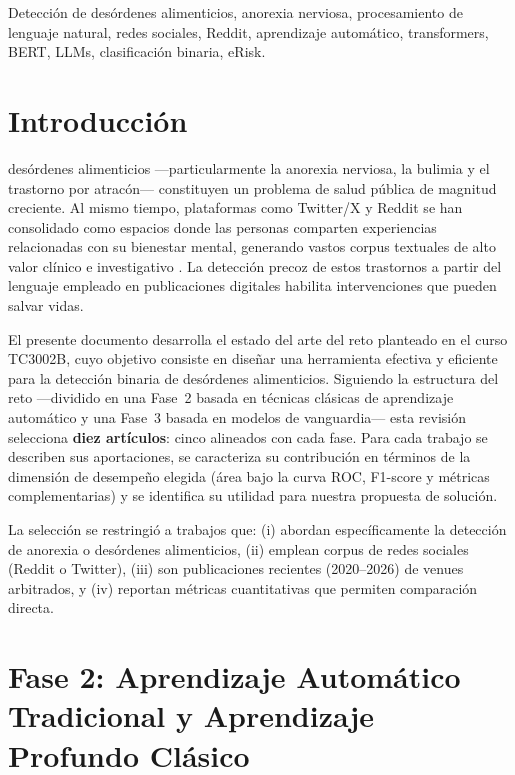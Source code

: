 \documentclass[journal]{IEEEtran}
\begin{document}
\begin{IEEEkeywords}
Detección de desórdenes alimenticios, anorexia nerviosa, procesamiento de lenguaje natural, redes sociales, Reddit, aprendizaje automático, transformers, BERT, LLMs, clasificación binaria, eRisk.
\end{IEEEkeywords}

\section{Introducción}

 desórdenes alimenticios ---particularmente la anorexia nerviosa, la bulimia y el trastorno por atracón--- constituyen un problema de salud pública de magnitud creciente. Al mismo tiempo, plataformas como Twitter/X y Reddit se han consolidado como espacios donde las personas comparten experiencias relacionadas con su bienestar mental, generando vastos corpus textuales de alto valor clínico e investigativo \cite{montejo2024survey}. La detección precoz de estos trastornos a partir del lenguaje empleado en publicaciones digitales habilita intervenciones que pueden salvar vidas.

El presente documento desarrolla el estado del arte del reto planteado en el curso TC3002B, cuyo objetivo consiste en diseñar una herramienta efectiva y eficiente para la detección binaria de desórdenes alimenticios. Siguiendo la estructura del reto ---dividido en una Fase~2 basada en técnicas clásicas de aprendizaje automático y una Fase~3 basada en modelos de vanguardia--- esta revisión selecciona \textbf{diez artículos}: cinco alineados con cada fase. Para cada trabajo se describen sus aportaciones, se caracteriza su contribución en términos de la dimensión de desempeño elegida (área bajo la curva ROC, F1-score y métricas complementarias) y se identifica su utilidad para nuestra propuesta de solución.

La selección se restringió a trabajos que: (i) abordan específicamente la detección de anorexia o desórdenes alimenticios, (ii) emplean corpus de redes sociales (Reddit o Twitter), (iii) son publicaciones recientes (2020--2026) de venues arbitrados, y (iv) reportan métricas cuantitativas que permiten comparación directa.

\section{Fase 2: Aprendizaje Automático Tradicional y Aprendizaje Profundo Clásico}
\end{document}
